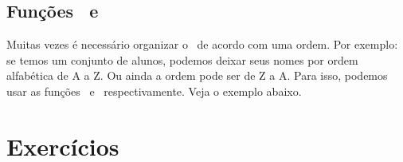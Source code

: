 
\subsection{Funções \funcaosort~e \funcaorsort}
\label{funcoes-sort-e-rsort}

Muitas vezes é necessário organizar o \tipoarray~de acordo com uma ordem. Por exemplo:
se temos um conjunto de alunos, podemos deixar seus nomes por ordem alfabética de A a Z.
Ou ainda a ordem pode ser de Z a A. Para isso, podemos usar as funções \funcaosort~e
\funcaorsort~respectivamente. Veja o exemplo abaixo.



\section{Exercícios}
\label{cap6-exercicios}

